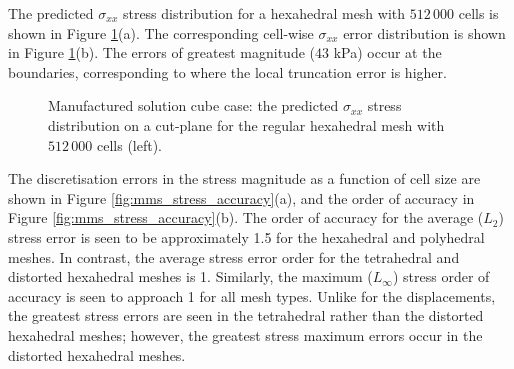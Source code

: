 \documentclass[sn-mathphys,Numbered]{sn-jnl}%
\begin{document}
The predicted $\sigma_{xx}$ stress distribution for a hexahedral mesh with $512\,000$ cells is shown in Figure \ref{fig:mms_stress}(a).
The corresponding cell-wise $\sigma_{xx}$ error distribution is shown in Figure \ref{fig:mms_stress}(b).
The errors of greatest magnitude ($43$ kPa) occur at the boundaries, corresponding to where the local truncation error is higher. %
\begin{figure}[htbp]
	\centering
	\caption{Manufactured solution cube case: the predicted $\sigma_{xx}$ stress distribution on a cut-plane for the regular hexahedral mesh with $512\,000$ cells (left).}
	\label{fig:mms_stress}
\end{figure}
The discretisation errors in the stress magnitude as a function of cell size are shown in Figure \ref{fig:mms_stress_accuracy}(a), and the order of accuracy in Figure \ref{fig:mms_stress_accuracy}(b).
The order of accuracy for the average ($L_2$) stress error is seen to be approximately 1.5 for the hexahedral and polyhedral meshes.
In contrast, the average stress error order for the tetrahedral and distorted hexahedral meshes is 1.
Similarly, the maximum ($L_\infty$) stress order of accuracy is seen to approach 1 for all mesh types.
Unlike for the displacements, the greatest stress errors are seen in the tetrahedral rather than the distorted hexahedral meshes; however, the greatest stress maximum errors occur in the distorted hexahedral meshes.
\end{document}
